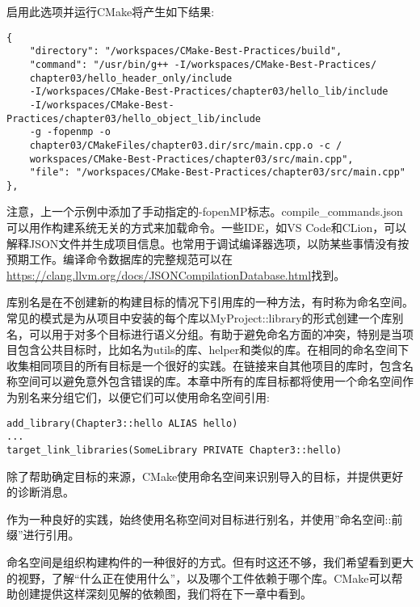 启用此选项并运行CMake将产生如下结果:

\begin{lstlisting}[style=styleCMake]
{
	"directory": "/workspaces/CMake-Best-Practices/build",
	"command": "/usr/bin/g++ -I/workspaces/CMake-Best-Practices/
	chapter03/hello_header_only/include
    -I/workspaces/CMake-Best-Practices/chapter03/hello_lib/include
    -I/workspaces/CMake-Best-Practices/chapter03/hello_object_lib/include
    -g -fopenmp -o
	chapter03/CMakeFiles/chapter03.dir/src/main.cpp.o -c /
	workspaces/CMake-Best-Practices/chapter03/src/main.cpp",
	"file": "/workspaces/CMake-Best-Practices/chapter03/src/main.cpp"
},
\end{lstlisting}

注意，上一个示例中添加了手动指定的-fopenMP标志。compile\_commands.json可以用作构建系统无关的方式来加载命令。一些IDE，如VS Code和CLion，可以解释JSON文件并生成项目信息。也常用于调试编译器选项，以防某些事情没有按预期工作。编译命令数据库的完整规范可以在\url{https://clang.llvm.org/docs/JSONCompilationDatabase.html}找到。


库别名是在不创建新的构建目标的情况下引用库的一种方法，有时称为命名空间。常见的模式是为从项目中安装的每个库以MyProject::library的形式创建一个库别名，可以用于对多个目标进行语义分组。有助于避免命名方面的冲突，特别是当项目包含公共目标时，比如名为utils的库、helper和类似的库。在相同的命名空间下收集相同项目的所有目标是一个很好的实践。在链接来自其他项目的库时，包含名称空间可以避免意外包含错误的库。本章中所有的库目标都将使用一个命名空间作为别名来分组它们，以便它们可以使用命名空间引用:

\begin{lstlisting}[style=styleCMake]
add_library(Chapter3::hello ALIAS hello)
...
target_link_libraries(SomeLibrary PRIVATE Chapter3::hello)
\end{lstlisting}

除了帮助确定目标的来源，CMake使用命名空间来识别导入的目标，并提供更好的诊断消息。

\begin{tcolorbox}[colback=blue!5!white,colframe=blue!75!black,title=使用命名空间]
作为一种良好的实践，始终使用名称空间对目标进行别名，并使用”命名空间::前缀”进行引用。
\end{tcolorbox}

命名空间是组织构建构件的一种很好的方式。但有时这还不够，我们希望看到更大的视野，了解“什么正在使用什么”，以及哪个工件依赖于哪个库。CMake可以帮助创建提供这样深刻见解的依赖图，我们将在下一章中看到。














